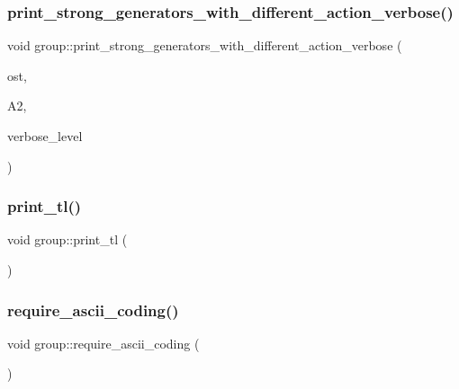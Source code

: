 \subsubsection{\texorpdfstring{print\+\_\+strong\+\_\+generators\+\_\+with\+\_\+different\+\_\+action\+\_\+verbose()}{print\_strong\_generators\_with\_different\_action\_verbose()}}
{\footnotesize\ttfamily void group\+::print\+\_\+strong\+\_\+generators\+\_\+with\+\_\+different\+\_\+action\+\_\+verbose (\begin{DoxyParamCaption}\item[{ostream \&}]{ost,  }\item[{\mbox{\hyperlink{classaction}{action}} $\ast$}]{A2,  }\item[{\mbox{\hyperlink{galois_8h_a09fddde158a3a20bd2dcadb609de11dc}{I\+NT}}}]{verbose\+\_\+level }\end{DoxyParamCaption})}

\mbox{\label{classgroup_ae4b8fab1ef41830cf7677ad0d6408801}} 
\subsubsection{\texorpdfstring{print\+\_\+tl()}{print\_tl()}}
{\footnotesize\ttfamily void group\+::print\+\_\+tl (\begin{DoxyParamCaption}{ }\end{DoxyParamCaption})}

\mbox{\label{classgroup_a7b4323ca1322c3ef029657dadbd47e36}} 
\subsubsection{\texorpdfstring{require\+\_\+ascii\+\_\+coding()}{require\_ascii\_coding()}}
{\footnotesize\ttfamily void group\+::require\+\_\+ascii\+\_\+coding (\begin{DoxyParamCaption}{ }\end{DoxyParamCaption})}

\mbox{\label{classgroup_a657b3eaca7a2fd46ffb25589f06532d6}} 
